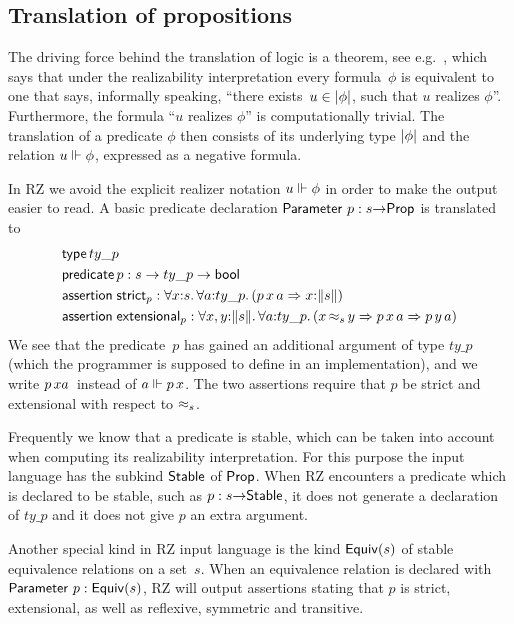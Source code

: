 \subsection{Translation of propositions}
\label{sec:transl-prop}

The driving force behind the translation of logic is a theorem, see
e.g.\ \cite[Thm.~4.4.10]{Troelstra:van-Dalen:88:1}, which says that
under the realizability interpretation every formula~$\phi$ is
equivalent to one that says, informally speaking, ``there exists~$u
\in |\phi|$, such that $u$ realizes $\phi$''. Furthermore, the
formula ``$u$ realizes $\phi$'' is computationally trivial. The
translation of a predicate $\phi$ then consists of its underlying type
$|\phi|$ and the relation $u \Vdash \phi$, expressed as a negative
formula.

In RZ we avoid the explicit realizer notation $u \Vdash \phi$ in order to
make the output easier to read. A basic predicate declaration
$\mathsf{Parameter}\ p : s{\to}\mathsf{Prop}$ is translated to
%
\begin{align*}
  & \otyspec{ty\_p} \\
  & \opropspec{p}{s \to ty\_p \to \oProp} \\
  & \oassertion{\mathsf{strict}_p}{
    \oforall{x}{s}{
      \oforall{a}{ty\_p}{
        (\oimply
        {\oapp{\oapp{p}{x}}{a}}
        {\ototal{x}{s}
        })
      }
    }
  } \\
  & \oassertion{\mathsf{extensional}_p}{
    \oforallt{x,y}{s}{
      \oforall{a}{ty\_p}{
          (\oimply{\oper{s}{x}{y}}
          {\oimply{\oapp{\oapp{p}{x}}{a}}{\oapp{\oapp{p}{y}}{a}}})
          }}}
\end{align*}
%
We see that the predicate~$p$ has gained an additional argument of
type $ty\_p$ (which the programmer is supposed to define in an
implementation), and we write $\oapp{\oapp{p}{x}{a}}$ instead of $a
\Vdash p\,x$. The two assertions require that $p$ be strict and
extensional with respect to $\approx_s$.

Frequently we know that a predicate is stable, which can be taken into
account when computing its realizability interpretation. For this
purpose the input language has the subkind $\mathsf{Stable}$ of $\mathsf{Prop}$.
When RZ encounters a predicate which is declared to be stable, such as
$p : s{\to}\mathsf{Stable}$, it does not generate a declaration of
$ty\_p$ and it does not give $p$ an extra argument.

Another special kind in RZ input language is the kind $\mathsf{Equiv}(s)$ of
stable equivalence relations on a set~$s$. When an equivalence
relation is declared with $\mathsf{Parameter}\ p : \mathsf{Equiv}(s)$, RZ will output
assertions stating that $p$ is strict, extensional, as well as
reflexive, symmetric and transitive.

